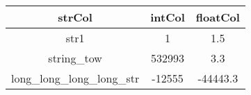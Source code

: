 \begin{tabular}{c|c|c}
	strCol & intCol & floatCol \\
	\hline
	str1 & 1 & 1.5 \\
	\hline
	string\_tow & 532993 & 3.3 \\
	\hline
	long\_long\_long\_long\_str & -12555 & -44443.3 \\
\end{tabular}